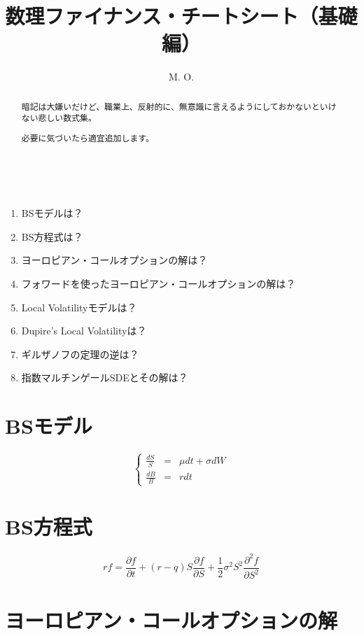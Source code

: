 \documentclass[uplatex]{jsarticle}
\title{
数理ファイナンス・チートシート（基礎編）
}
\author{
M. O.
}
\begin{document}
\maketitle

\begin{abstract}
	暗記は大嫌いだけど、職業上、反射的に、無意識に言えるようにしておかないといけない悲しい数式集。

	必要に気づいたら適宜追加します。
\end{abstract}

\ \\

\begin{enumerate}
	\item BSモデルは？
	\item BS方程式は？
	\item ヨーロピアン・コールオプションの解は？
	\item フォワードを使ったヨーロピアン・コールオプションの解は？
	\item Local Volatilityモデルは？
	\item Dupire's Local Volatilityは？
	\item ギルザノフの定理の逆は？
	\item 指数マルチンゲールSDEとその解は？
\end{enumerate}

\newpage



\section{BSモデル}

\[
	\left\{
	\begin{array}{rcl}
		\displaystyle \frac{dS}{S} & = & \mu dt + \sigma dW \\
		\displaystyle \frac{dB}{B} & = & r dt
	\end{array}
	\right.
\]

\section{BS方程式}

\[
	rf
	=
	\frac{\partial f}{\partial t}
	+
	(r-q) S \frac{\partial f}{\partial S}
	+
	\frac{1}{2} \sigma^{2} S^{2}
	\frac{\partial^{2} f}{\partial S^{2}}
\]


\section{ヨーロピアン・コールオプションの解}
\end{document}
